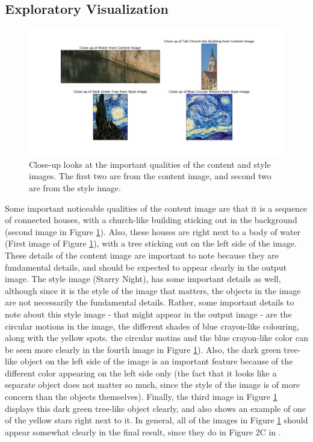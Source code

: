 \documentclass[12pt]{article}
\begin{document}
\subsection{Exploratory Visualization}
\begin{figure}[h!]
\centering
  \includegraphics[width=160mm, scale = 1]{explorevisualization.jpg}
  \caption{Close-up looks at the important qualities of the content and style images. The first two are from the content image, and second two are from the style image.}
  \label{fig:explore}
\end{figure}
Some important noticeable qualities of the content image are that it is a sequence of connected houses, with a church-like building sticking out in the background (second image in Figure \ref{fig:explore}). Also, these houses are right next to a body of water (First image of Figure \ref{fig:explore}), with a tree sticking out on the left side of the image. These details of the content image are important to note because they are fundamental details, and should be expected to appear clearly in the output image. The style image (Starry Night), has some important details as well, although since it is the style of the image that matters, the objects in the image are not necessarily the fundamental details. Rather, some important details to note about this style image - that might appear in the output image - are the circular motions in the image, the different shades of blue crayon-like colouring, along with the yellow spots. the circular motins and the blue crayon-like color can be seen more clearly in the fourth image in Figure \ref{fig:explore}). Also, the dark green tree-like object on the left side of the image is an important feature because of the different color appearing on the left side only (the fact that it looks like a separate object does not matter so much, since the style of the image is of more concern than the objects themselves). Finally, the third image in Figure \ref{fig:explore} displays this dark green tree-like object clearly, and also shows an example of one of the yellow stars right next to it. In general, all of the images in Figure \ref{fig:explore} should appear somewhat clearly in the final result, since they do in Figure 2C in \cite{Neural}.
\end{document}
